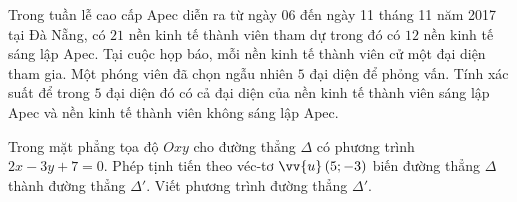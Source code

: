 \begin{bt}%
Trong tuần lễ cao cấp Apec diễn ra từ ngày 06 đến ngày 11 tháng 11 năm 2017 tại Đà Nẵng, có $21$ nền kinh tế thành viên tham dự trong đó có $12$ nền kinh tế sáng lập Apec. Tại cuộc họp báo, mỗi nền kinh tế thành viên cử một đại diện tham gia. Một phóng viên đã chọn ngẫu nhiên $5$ đại diện để phỏng vấn. Tính xác suất để trong $5$ đại diện đó có cả đại diện của nền kinh tế thành viên sáng lập Apec và nền kinh tế thành viên không sáng lập Apec.
\end{bt}
\begin{bt}%
Trong mặt phẳng tọa độ $Oxy$ cho đường thẳng $\Delta $ có phương trình $2x-3y+7=0$. Phép tịnh tiến theo véc-tơ $\vv{u}\left(5;-3\right)$ biến đường thẳng $\Delta $ thành đường thẳng $\Delta'$. Viết phương trình đường thẳng $\Delta'$.
\end{bt}
